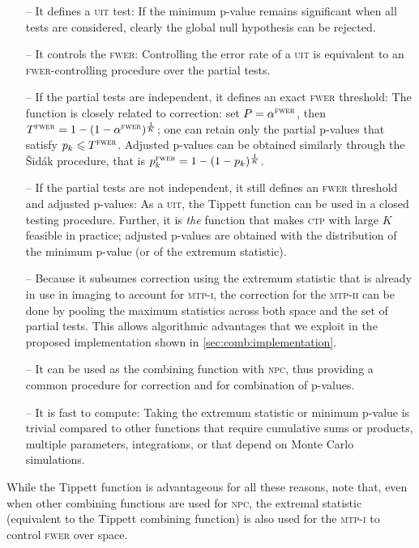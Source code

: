 \begin{itemize}[leftmargin=*]
\item[--] It defines a \textsc{uit} test: If the minimum p-value remains significant when all tests are considered, clearly the global null hypothesis can be rejected.
\item[--] It controls the \textsc{fwer}: Controlling the error rate of a \textsc{uit} is equivalent to an \textsc{fwer}-controlling procedure over the partial tests.
\item[--] If the partial tests are independent, it defines an exact \textsc{fwer} threshold: The function is closely related to \citet{Sidak1967} correction: set $P=\alpha^{\text{\textsc{fwer}}}$, then $T^{\text{\textsc{fwer}}}=1-(1-\alpha^{\text{\textsc{fwer}}})^{\frac{1}{K}}$; one can retain only the partial p-values that satisfy $p_k \leqslant T^{\text{\textsc{fwer}}}$. Adjusted p-values can be obtained similarly through the \v{S}id\'{a}k procedure, that is $p_k^\textsc{fwer}=1-(1-p_k)^{\frac{1}{K}}$.
\item[--] If the partial tests are not independent, it still defines an \textsc{fwer} threshold and adjusted p-values: As a \textsc{uit}, the Tippett function can be used in a closed testing procedure. Further, it is \emph{the} function that makes \textsc{ctp} with large $K$ feasible in practice; adjusted p-values are obtained with the distribution of the minimum p-value (or of the extremum statistic).
\item[--] Because it subsumes correction using the extremum statistic that is already in use in imaging to account for \textsc{mtp-i}, the correction for the \textsc{mtp-ii} can be done by pooling the maximum statistics across both space and the set of partial tests. This allows algorithmic advantages that we exploit in the proposed implementation shown in \ref{sec:comb:implementation}.
\item[--] It can be used as the combining function with \textsc{npc}, thus providing a common procedure for correction and for combination of p-values.
\item[--] It is fast to compute: Taking the extremum statistic or minimum p-value is trivial compared to other functions that require cumulative sums or products, multiple parameters, integrations, or that depend on Monte Carlo simulations.
\end{itemize}

While the Tippett function is advantageous for all these reasons, note that, even when other combining functions are used for \textsc{npc}, the extremal statistic (equivalent to the Tippett combining function) is also used for the \textsc{mtp-i} to control \textsc{fwer} over space.

